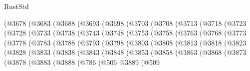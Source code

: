 \begin{lexlean}{RustStd}
\begin{coremodule}
    (@3678
      (@3683
        (@3688
          (@3693
            (@3698
              (@3703
                (@3708
                  (@3713
                    (@3718
                      (@3723
                        (@3728
                          (@3733
                            (@3738
                              (@3743
                                (@3748
                                  (@3753
                                    (@3758
                                      (@3763
                                        (@3768
                                          (@3773
                                            (@3778
                                              (@3783
                                                (@3788
                                                  (@3793
                                                    (@3798
                                                      (@3803
                                                        (@3808
                                                          (@3813
                                                            (@3818
                                                              (@3823
                                                                (@3828
                                                                  (@3833
                                                                    (@3838
                                                                      (@3843
                                                                        (@3848
                                                                          (@3853
                                                                            (@3858
                                                                              (@3863
                                                                                (@3868
                                                                                  (@3873
                                                                                    (@3878
                                                                                      (@3883
                                                                                        (@3888
                                                                                          (@786
                                                                                            (@506
                                                                                              @3889
                                                                                              (@509

\end{coremodule}
\end{lexlean}
